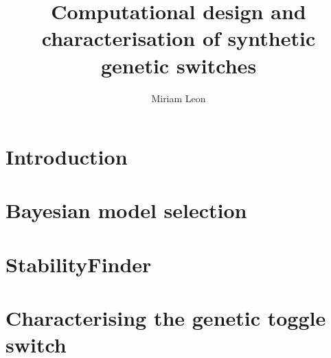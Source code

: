 \documentclass[]{phdthesis}
\title{Computational design and\\characterisation of synthetic\\ genetic switches}
\author{Miriam Leon}
\begin{document}
\maketitle


\begin{abstract}
\end{abstract}

\tableofcontents*
\listoffigures
\listoftables
{}

\printglossary[type=\acronymtype, title=Abbreviations, toctitle=Abbreviations]

\begin{acknowledgements}
\end{acknowledgements}


\mainmatter*
\chapter{Introduction}


\mainmatter*
\chapter{Bayesian model selection}



\mainmatter*
\chapter{StabilityFinder}

%
%
%
%
%


\mainmatter*
\chapter{Characterising the genetic toggle switch}

\end{document}
